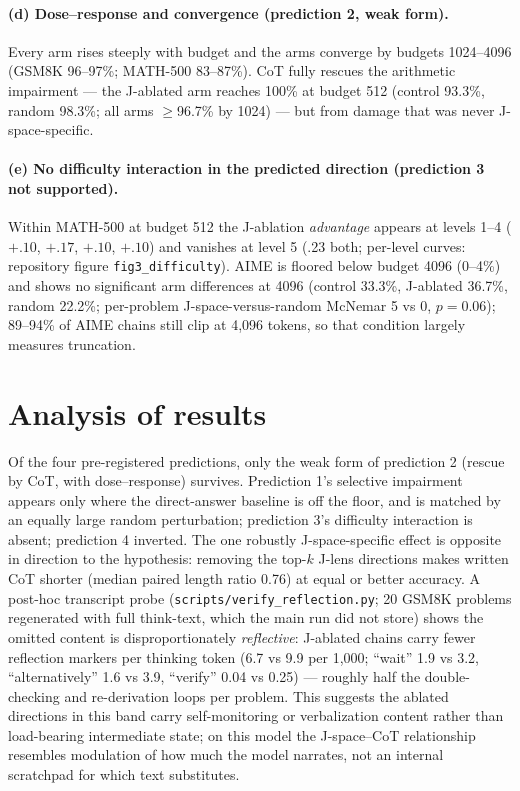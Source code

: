 \documentclass[9pt,twocolumn]{extarticle}
\begin{document}
\paragraph{(d) Dose--response and convergence (prediction 2, weak form).}
Every arm rises steeply with budget and the arms converge by budgets
1024--4096 (GSM8K 96--97\%; MATH-500 83--87\%). CoT fully rescues the
arithmetic impairment --- the J-ablated arm reaches 100\% at budget 512
(control 93.3\%, random 98.3\%; all arms $\geq$96.7\% by 1024) --- but from
damage that was never J-space-specific.

\paragraph{(e) No difficulty interaction in the predicted direction
(prediction 3 not supported).} Within MATH-500 at budget 512 the
J-ablation \emph{advantage} appears at levels 1--4 ($+.10$, $+.17$, $+.10$,
$+.10$) and vanishes at level 5 (.23 both; per-level curves: repository
figure \texttt{fig3\_difficulty}). AIME is floored below budget 4096
(0--4\%) and shows no significant arm differences at 4096 (control
33.3\%, J-ablated 36.7\%, random 22.2\%; per-problem J-space-versus-random
McNemar 5 vs 0, $p = 0.06$); 89--94\% of AIME chains still clip at
4{,}096 tokens, so that condition largely measures truncation.

\section{Analysis of results}

Of the four pre-registered predictions, only the weak form of prediction 2
(rescue by CoT, with dose--response) survives. Prediction 1's selective
impairment appears only where the direct-answer baseline is off the floor,
and is matched by an equally large random perturbation; prediction 3's
difficulty interaction is absent; prediction 4 inverted. The one robustly
J-space-specific effect is opposite in direction to the hypothesis:
removing the top-$k$ J-lens directions makes written CoT shorter (median
paired length ratio 0.76) at equal or better accuracy. A post-hoc
transcript probe (\texttt{scripts/verify\_reflection.py}; 20 GSM8K problems
regenerated with full think-text, which the main run did not store) shows
the omitted content is disproportionately \emph{reflective}: J-ablated
chains carry fewer reflection markers per thinking token (6.7 vs 9.9 per
1{,}000; ``wait'' 1.9 vs 3.2, ``alternatively'' 1.6 vs 3.9, ``verify''
0.04 vs 0.25) --- roughly half the double-checking and re-derivation loops
per problem. This suggests the ablated directions in this band carry
self-monitoring or verbalization content rather than load-bearing
intermediate state; on this model the J-space--CoT relationship resembles
modulation of how much the model narrates, not an internal scratchpad for
which text substitutes.
\end{document}
